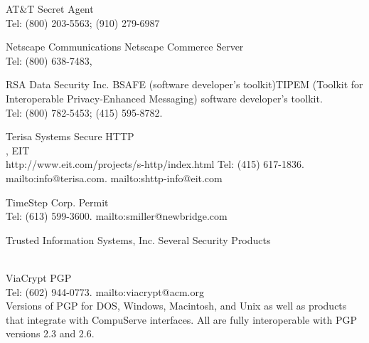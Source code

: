\begin{htmllist}
  \item[AT\&T]
    Secret Agent\\
    Tel: (800) 203-5563; (910) 279-6987

  \item[Netscape Communications]
    Netscape Commerce Server\\
    Tel: (800) 638-7483,

  \item[RSA Data Security Inc.]
    BSAFE (software developer's toolkit)TIPEM (Toolkit for Interoperable
    Privacy-Enhanced Messaging) software developer's toolkit.\\
    Tel: (800) 782-5453; (415) 595-8782.

  \item[Terisa Systems]
    Secure HTTP\\
    ,
    EIT\\
    {http://www.eit.com/projects/s-http/index.html}
    Tel: (415) 617-1836.
    {mailto:info@terisa.com}.
    {mailto:shttp-info@eit.com}

  \item[TimeStep Corp.]
    Permit\\
    Tel: (613) 599-3600.
    {mailto:smiller@newbridge.com}

  \item[Trusted Information Systems, Inc.]
    Several Security Products\\
    \\

  \item[ViaCrypt]
    PGP\\
    Tel: (602) 944-0773.
    {mailto:viacrypt@acm.org}\\
    Versions of PGP for DOS, Windows, Macintosh, and Unix as well as
    products that integrate with CompuServe interfaces. All are fully
    interoperable with PGP versions 2.3 and 2.6.
\end{htmllist}


